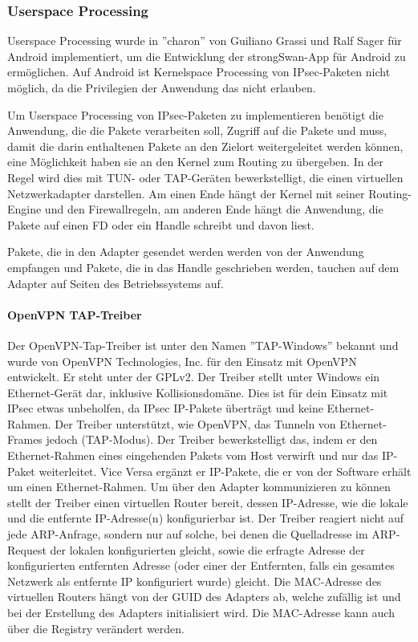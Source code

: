 \subsubsection{Userspace Processing}
Userspace Processing wurde in ''charon'' von Guiliano Grassi und Ralf Sager für Android implementiert,
um die Entwicklung der strongSwan-App für Android zu ermöglichen. Auf Android ist Kernelspace Processing
von \ac{IPsec}-Paketen nicht möglich, da die Privilegien der Anwendung das nicht erlauben.

Um Userspace Processing von \ac{IPsec}-Paketen zu implementieren benötigt
die Anwendung, die die Pakete verarbeiten soll, Zugriff auf die Pakete und muss,
damit die darin enthaltenen Pakete an den Zielort weitergeleitet werden können,
eine Möglichkeit haben sie an den Kernel zum Routing zu übergeben. In der Regel wird
dies mit TUN- oder TAP-Geräten bewerkstelligt, die einen virtuellen Netzwerkadapter
darstellen. Am einen Ende hängt der Kernel mit seiner Routing-Engine und den Firewallregeln,
am anderen Ende hängt die Anwendung, die Pakete auf einen \ac{FD} oder ein Handle schreibt
und davon liest.

Pakete, die in den Adapter gesendet werden werden von der Anwendung empfangen
und Pakete, die in das Handle geschrieben werden, tauchen auf dem Adapter auf Seiten
des Betriebssystems auf.

\paragraph{OpenVPN TAP-Treiber}
Der OpenVPN-Tap-Treiber ist unter den Namen ''TAP-Windows'' bekannt und wurde von
OpenVPN Technologies, Inc. für den Einsatz mit OpenVPN entwickelt.
Er steht unter der GPLv2.
Der Treiber stellt unter Windows ein Ethernet-Gerät dar, inklusive Kollisionsdomäne.
Dies ist für dein Einsatz mit \ac{IPsec} etwas unbeholfen, da \ac{IPsec} \ac{IP}-Pakete
überträgt und keine Ethernet-Rahmen.
Der Treiber unterstützt, wie OpenVPN, das Tunneln von Ethernet-Frames jedoch (TAP-Modus).
Der Treiber bewerkstelligt das, indem er den Ethernet-Rahmen eines eingehenden Pakets vom
Host verwirft und nur das IP-Paket weiterleitet. Vice Versa ergänzt er IP-Pakete, die er von
der Software erhält um einen Ethernet-Rahmen. Um über den Adapter kommunizieren zu können
stellt der Treiber einen virtuellen Router bereit, dessen \ac{IP}-Adresse, wie die lokale  und
die entfernte IP-Adresse(n) konfigurierbar ist.
Der Treiber reagiert nicht auf jede ARP-Anfrage, sondern nur auf solche, bei denen
die Quelladresse im ARP-Request der lokalen konfigurierten gleicht, sowie die erfragte Adresse
der konfigurierten entfernten Adresse (oder einer der Entfernten, falls ein gesamtes Netzwerk
als entfernte IP konfiguriert wurde) gleicht.
Die MAC-Adresse des virtuellen Routers hängt von der GUID des Adapters ab, welche zufällig ist
und bei der Erstellung des Adapters initialisiert wird. Die MAC-Adresse kann 
auch über die Registry verändert werden.

